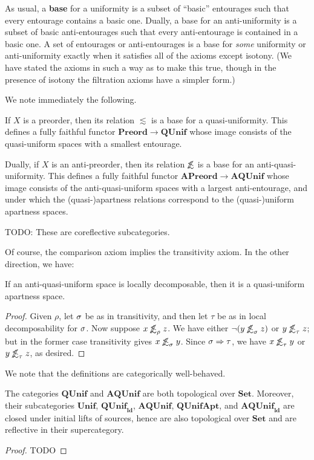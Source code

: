 \documentclass{article}
\def\oapt{\mathrel{\!\not\,\not\lesssim}}
\def\leapx{\lesssim}
\def\aent#1{\oapt_{#1}}
\let\implies\Rightarrow
\def\Set{\mathbf{Set}}
\def\Preord{\mathbf{Preord}}
\def\APreord{\mathbf{APreord}}
\def\QUnif{\mathbf{QUnif}}
\def\Unif{\mathbf{Unif}}
\def\ldQUnif{\mathbf{QUnif}_{\mathbf{ld}}}
\def\AQUnif{\mathbf{AQUnif}}
\def\QUnifApt{\mathbf{QUnifApt}}
\def\ldAQUnif{\mathbf{AQUnif}_{\mathbf{ld}}}
\begin{document}
As usual, a \textbf{base} for a uniformity is a subset of ``basic'' entourages such that every entourage contains a basic one.
Dually, a base for an anti-uniformity is a subset of basic anti-entourages such that every anti-entourage is contained in a basic one.
A set of entourages or anti-entourages is a base for \emph{some} uniformity or anti-uniformity exactly when it satisfies all of the axioms except isotony.
(We have stated the axioms in such a way as to make this true, though in the presence of isotony the filtration axioms have a simpler form.)

We note immediately the following.

\begin{thm}
  If $X$ is a preorder, then its relation $\leapx$ is a base for a quasi-uniformity.
  This defines a fully faithful functor $\Preord\to\QUnif$ whose image consists of the quasi-uniform spaces with a smallest entourage.

  Dually, if $X$ is an anti-preorder, then its relation $\oapt$ is a base for an anti-quasi-uniformity.
  This defines a fully faithful functor $\APreord\to\AQUnif$ whose image consists of the anti-quasi-uniform spaces with a largest anti-entourage, and under which the (quasi-)apartness relations correspond to the (quasi-)uniform apartness spaces.
\end{thm}

TODO: These are coreflective subcategories.

Of course, the comparison axiom implies the transitivity axiom.
In the other direction, we have:

\begin{lem}
  If an anti-quasi-uniform space is locally decomposable, then it is a quasi-uniform apartness space.
\end{lem}
\begin{proof}
  Given $\rho$, let $\sigma$ be as in transitivity, and then let $\tau$ be as in local decomposability for $\sigma$.
  Now suppose $x\aent\rho z$.
  We have either $\neg(y\aent\si z)$ or $y\aent\tau z$; but in the former case transitivity gives $x\aent\si y$.
  Since $\si\implies\tau$, we have $x\aent\tau y$ or $y\aent\tau z$, as desired.
\end{proof}

We note that the definitions are categorically well-behaved.

\begin{thm}
  The categories $\QUnif$ and $\AQUnif$ are both topological over $\Set$.
  Moreover, their subcategories $\Unif$, $\ldQUnif$, $\AQUnif$, $\QUnifApt$, and $\ldAQUnif$ are closed under initial lifts of sources, hence are also topological over $\Set$ and are reflective in their supercategory.
\end{thm}
\begin{proof}
  TODO
\end{proof}
\end{document}
